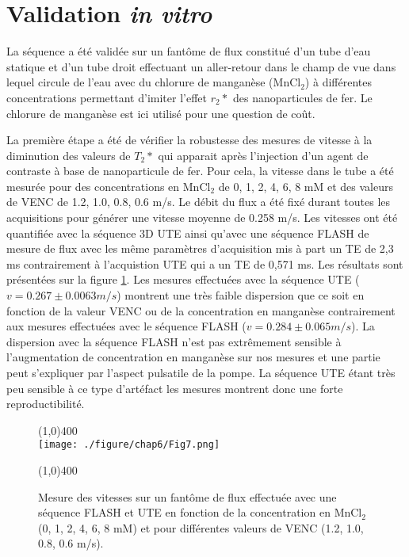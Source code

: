 \section{Validation \textit{in vitro}}

La séquence a été validée sur un fantôme de flux constitué d'un tube d'eau statique et d'un tube droit effectuant un aller-retour dans le champ de vue dans lequel circule de l'eau avec du chlorure de manganèse ($\text{MnCl}_2$) à différentes concentrations permettant d'imiter l'effet $r_2*$ des nanoparticules de fer. Le chlorure de manganèse est ici utilisé pour une question de coût.

La première étape a été de vérifier la robustesse des mesures de vitesse à la diminution des valeurs de $T_2*$ qui apparait après l'injection d'un agent de contraste à base de nanoparticule de fer. Pour cela, la vitesse dans le tube a été mesurée pour des concentrations en $\text{MnCl}_2$ de 0, 1, 2, 4, 6, 8 mM et des valeurs de VENC de 1.2, 1.0, 0.8, 0.6 m/s. Le débit du flux a été fixé durant toutes les acquisitions pour générer une vitesse moyenne de 0.258 m/s. Les vitesses ont été quantifiée avec la séquence 3D UTE ainsi qu'avec une séquence FLASH de mesure de flux avec les même paramètres d'acquisition mis à part un TE de 2,3 ms contrairement à l'acquistion UTE qui a un TE de 0,571 ms. Les résultats sont présentées sur la figure \ref{fig:FluxFantT2}. Les mesures effectuées avec la séquence UTE ($v=0.267 \pm 0.0063 m/s$) montrent une très faible dispersion que ce soit en fonction de la valeur VENC ou de la concentration en manganèse contrairement aux mesures effectuées avec le séquence FLASH ($v=0.284 \pm 0.065 m/s$). La dispersion avec la séquence FLASH n'est pas extrêmement sensible à l'augmentation de concentration en manganèse sur nos mesures et une partie peut s'expliquer par l'aspect pulsatile de la pompe. La séquence UTE étant très peu sensible à ce type d'artéfact les mesures montrent donc une forte reproductibilité.

\begin{figure}[H]
\centering
\line(1,0){400} \\
\texttt{[image: ./figure/chap6/Fig7.png]}
\caption[Mesure du flux en fonction du T2*]{\label{fig:FluxFantT2} Mesure des vitesses sur un fantôme de flux effectuée avec une séquence FLASH et UTE en fonction de la concentration en $\text{MnCl}_2$ (0, 1, 2, 4, 6, 8 mM) et pour différentes valeurs de VENC (1.2, 1.0, 0.8, 0.6 m/s).}
\line(1,0){400} \\ 
\end{figure}

